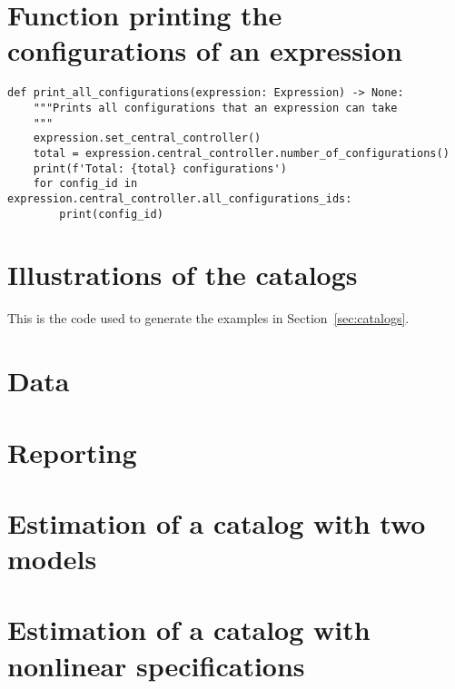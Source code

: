 \documentclass[12pt,a4paper]{article}
\newcommand*{\examplesPath}{../../examples}
\begin{document}
\section{Function printing the configurations of an expression}\label{sec:print}
\begin{lstlisting}
def print_all_configurations(expression: Expression) -> None:
    """Prints all configurations that an expression can take
    """
    expression.set_central_controller()
    total = expression.central_controller.number_of_configurations()
    print(f'Total: {total} configurations')
    for config_id in expression.central_controller.all_configurations_ids:
        print(config_id)
\end{lstlisting}

\section{Illustrations of the catalogs}\label{sec:simple}
This is the code used to generate the examples in Section~\ref{sec:catalogs}.



\section{Data}\label{sec:data}



\section{Reporting}\label{sec:reporting}



\section{Estimation of a catalog with two models}\label{sec:b01model}



\section{Estimation of a catalog with nonlinear specifications}\label{sec:b02nonlinear}
\end{document}
